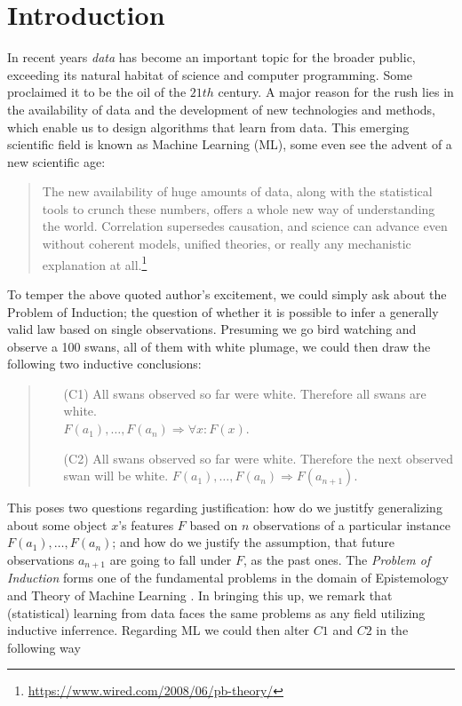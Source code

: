 \section{Introduction}\label{Sec:intro}

In recent years \textit{data} has become an important topic for the broader public, exceeding its natural habitat of science and computer programming. Some proclaimed it to be the oil of the $21{th}$ century. A major reason for the rush lies in the availability of data and the development of new technologies and methods, which enable us to design algorithms that learn from data. This emerging scientific field is known as Machine Learning (ML), some even see the advent of a new scientific age:
\begin{quote}
	\small
	The new availability of huge amounts of data, along with the statistical tools to crunch these numbers, offers a whole new way of understanding the world. Correlation supersedes causation, and science can advance even without coherent models, unified theories, or really any mechanistic explanation at all.\footnote{\url{https://www.wired.com/2008/06/pb-theory/}}
\end{quote}
To temper the above quoted author's excitement, we could simply ask about the Problem of Induction; the question of whether it is possible to infer a generally valid law based on single observations. Presuming we go bird watching and observe a 100 swans, all of them with white plumage, we could then draw the following two inductive conclusions:
\begin{quote}
	\begin{itemize}
		\small
		\item[(C1)] All swans observed so far were white. Therefore all swans are white.\\ $F(a_1),\dots, F(a_n) \Rightarrow \forall x: F(x)$. 
		\item[(C2)] All swans observed so far were white. Therefore the next observed swan will be white. $F(a_1),\dots,F(a_n) \Rightarrow F(a_{n+1})$.
	\end{itemize}
\end{quote} 
This poses two questions regarding justification: how do we justitfy generalizing about some object $x$'s features $F$ based on $n$ observations of a particular instance $F(a_1),\dots,F(a_n) $; and how do we justify the assumption, that future observations $a_{n+1}$ are going to fall under $F$, as the past ones. The \textit{Problem of Induction} forms one of the fundamental problems in the domain of Epistemology and Theory of Machine Learning \cite{sterkenburg2020no}. In bringing this up, we remark that (statistical) learning from data faces the same problems as any field utilizing inductive inferrence. Regarding ML we could then alter $C1$ and $C2$ in the following way
